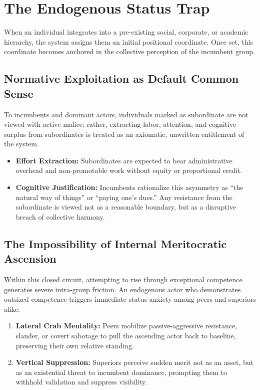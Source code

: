 \documentclass[11pt,a4paper]{article}
\begin{document}
\section{The Endogenous Status Trap}
When an individual integrates into a pre-existing social, corporate, or academic hierarchy, the system assigns them an initial positional coordinate. Once set, this coordinate becomes anchored in the collective perception of the incumbent group.

\subsection{Normative Exploitation as Default Common Sense}
To incumbents and dominant actors, individuals marked as subordinate are not viewed with active malice; rather, extracting labor, attention, and cognitive surplus from subordinates is treated as an axiomatic, unwritten entitlement of the system. 
\begin{itemize}
    \item \textbf{Effort Extraction:} Subordinates are expected to bear administrative overhead and non-promotable work without equity or proportional credit.
    \item \textbf{Cognitive Justification:} Incumbents rationalize this asymmetry as ``the natural way of things'' or ``paying one's dues.'' Any resistance from the subordinate is viewed not as a reasonable boundary, but as a disruptive breach of collective harmony.
\end{itemize}

\subsection{The Impossibility of Internal Meritocratic Ascension}
Within this closed circuit, attempting to rise through exceptional competence generates severe intra-group friction. An endogenous actor who demonstrates outsized competence triggers immediate status anxiety among peers and superiors alike:
\begin{enumerate}
    \item \textbf{Lateral Crab Mentality:} Peers mobilize passive-aggressive resistance, slander, or covert sabotage to pull the ascending actor back to baseline, preserving their own relative standing.
    \item \textbf{Vertical Suppression:} Superiors perceive sudden merit not as an asset, but as an existential threat to incumbent dominance, prompting them to withhold validation and suppress visibility.
\end{enumerate}
\end{document}

